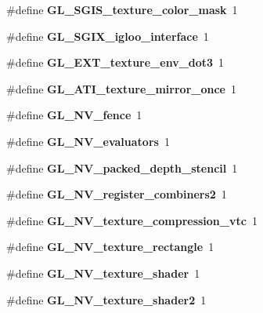 \begin{DoxyCompactItemize}
\item 
\#define {\bfseries G\+L\+\_\+\+S\+G\+I\+S\+\_\+texture\+\_\+color\+\_\+mask}~1\label{_s_d_l__opengl_8h_a4f65cbc5171bce0bc66c796117e40b00}

\item 
\#define {\bfseries G\+L\+\_\+\+S\+G\+I\+X\+\_\+igloo\+\_\+interface}~1\label{_s_d_l__opengl_8h_a4400f1af873c7efbbeb0e33a204eb169}

\item 
\#define {\bfseries G\+L\+\_\+\+E\+X\+T\+\_\+texture\+\_\+env\+\_\+dot3}~1\label{_s_d_l__opengl_8h_a284a74054c5e8a7d24666d9aa42d7724}

\item 
\#define {\bfseries G\+L\+\_\+\+A\+T\+I\+\_\+texture\+\_\+mirror\+\_\+once}~1\label{_s_d_l__opengl_8h_a8c17b096e1a91c28e77ba1e9d8dca595}

\item 
\#define {\bfseries G\+L\+\_\+\+N\+V\+\_\+fence}~1\label{_s_d_l__opengl_8h_aebdc60727d4ecdff3a2852131eea9327}

\item 
\#define {\bfseries G\+L\+\_\+\+N\+V\+\_\+evaluators}~1\label{_s_d_l__opengl_8h_a59353da1f6f92b69ca28a385b432bb85}

\item 
\#define {\bfseries G\+L\+\_\+\+N\+V\+\_\+packed\+\_\+depth\+\_\+stencil}~1\label{_s_d_l__opengl_8h_aa1ffd16dc665b93e4478030924bffcf5}

\item 
\#define {\bfseries G\+L\+\_\+\+N\+V\+\_\+register\+\_\+combiners2}~1\label{_s_d_l__opengl_8h_a7eb76ac482451abcbb3b5611a5f1ac83}

\item 
\#define {\bfseries G\+L\+\_\+\+N\+V\+\_\+texture\+\_\+compression\+\_\+vtc}~1\label{_s_d_l__opengl_8h_a5ac0b387d19e6f0ac922a68124c35dc6}

\item 
\#define {\bfseries G\+L\+\_\+\+N\+V\+\_\+texture\+\_\+rectangle}~1\label{_s_d_l__opengl_8h_ace8ce07db854751cad87b31b3f55c409}

\item 
\#define {\bfseries G\+L\+\_\+\+N\+V\+\_\+texture\+\_\+shader}~1\label{_s_d_l__opengl_8h_ab86362fec338d4d0731d245ca84a1e9b}

\item 
\#define {\bfseries G\+L\+\_\+\+N\+V\+\_\+texture\+\_\+shader2}~1\label{_s_d_l__opengl_8h_a14ac2e5a1c68b3d0d2d49629eb043eb5}


\end{DoxyCompactItemize}
